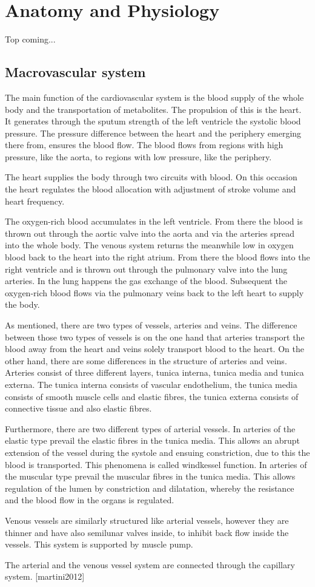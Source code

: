 \chapter{Anatomy and Physiology}
Top coming...

\section{Macrovascular system}
The main function of the cardiovascular system is the blood supply of the whole body and the transportation of metabolites. The propulsion of this is the heart. It generates through the sputum strength of the left ventricle the systolic blood pressure. The pressure difference between the heart and the periphery emerging there from, ensures the blood flow. The blood flows from regions with high pressure, like the aorta, to regions with low pressure, like the periphery.

The heart supplies the body through two circuits with blood. On this occasion the heart regulates the blood allocation with adjustment of stroke volume and heart frequency.

The oxygen-rich blood accumulates in the left ventricle. From there the blood is thrown out through the aortic valve into the aorta and via the arteries spread into the whole body. The venous system returns the meanwhile low in oxygen blood back to the heart into the right atrium. From there the blood flows into the right ventricle and is thrown out through the pulmonary valve into the lung arteries. In the lung happens the gas exchange of the blood. Subsequent the oxygen-rich blood flows via the pulmonary veins back to the left heart to supply the body.

As mentioned, there are two types of vessels, arteries and veins. The difference between those two types of vessels is on the one hand that arteries transport the blood away from the heart and veins solely transport blood to the heart. On the other hand, there are some differences in the structure of arteries and veins.
Arteries consist of three different layers, tunica interna, tunica media and tunica externa. The tunica interna consists of vascular endothelium,  the tunica media consists of smooth muscle cells and elastic fibres, the tunica externa consists of connective tissue and also elastic fibres.

Furthermore, there are two different types of arterial vessels. In arteries of the elastic type prevail the elastic fibres in the tunica media. This allows an abrupt extension of the vessel during the systole and ensuing constriction, due to this the blood is transported. This phenomena is called windkessel function. In arteries of the muscular type prevail the muscular fibres in the tunica media. This allows regulation of the lumen by constriction and dilatation, whereby the resistance and the blood flow in the organs is regulated.

Venous vessels are similarly structured like arterial vessels, however they are thinner and have also semilunar valves inside, to inhibit back flow inside the vessels. This system is supported by muscle pump.

The arterial and the venous vessel system are connected through the capillary system. [martini2012]
